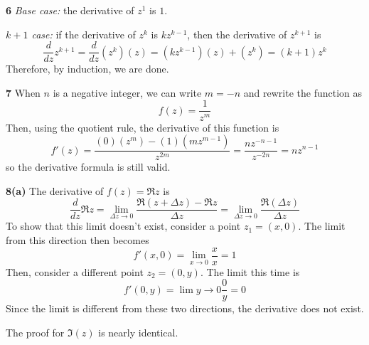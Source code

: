 \documentclass{article}
\begin{document}
\textbf{6}
\textit{Base case:} the derivative of $z^1$ is $1$.

\textit{$k+1$ case:} if the derivative of $z^k$ is $kz^{k-1}$, then the derivative of $z^{k+1}$ is
\[
	\frac{d}{dz} z^{k+1} 
	= \frac{d}{dz} (z^k)(z) 
	= (kz^{k-1})(z) + (z^k)
	= (k+1)z^k
\]
Therefore, by induction, we are done.

\textbf{7}
When $n$ is a negative integer, we can write $m = -n$ and rewrite the function as
\[
	f(z) = \frac{1}{z^m}
\]
Then, using the quotient rule, the derivative of this function is
\[
	f'(z)
	= \frac{(0)(z^m) - (1)(mz^{m-1})}{z^{2m}}
	= \frac{nz^{-n-1}}{z^{-2n}}
	= nz^{n-1}
\]
so the derivative formula is still valid.	

\textbf{8(a)}
The derivative of $f(z) = \Re z$ is
\[
	\frac{d}{dz} \Re z 
	= \lim_{\Delta z \to 0} \frac{\Re(z + \Delta z) - \Re z}{\Delta z}
	= \lim_{\Delta z \to 0} \frac{\Re (\Delta z)}{\Delta z}
\]
To show that this limit doesn't exist, consider a point $z_1 = (x,0)$. The limit from this direction then becomes
\[
	f'(x, 0) = \lim_{x \to 0} \frac{x}{x} 
	= 1
\]
Then, consider a different point $z_2 = (0, y)$. The limit this time is
\[
	f'(0, y) = \lim{y \to 0} \frac{0}{y} = 0
\]
Since the limit is different from these two directions, the derivative does not exist.

The proof for $\Im (z)$ is nearly identical.
\end{document}
